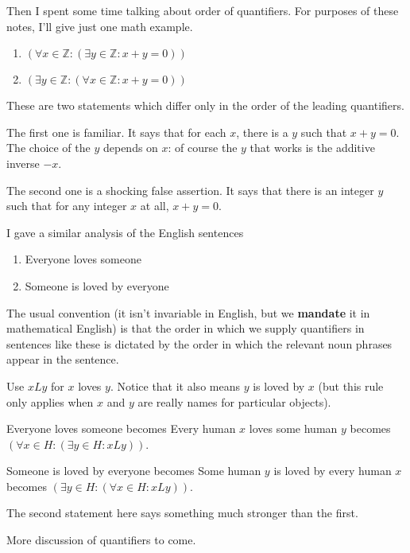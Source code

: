 \documentclass[12pt]{article}
\begin{document}
Then I spent some time talking about order of quantifiers.  For purposes of these notes, I'll give just one math example.

\begin{enumerate}

\item $(\forall x \in {\mathbb Z}:(\exists y \in {\mathbb Z}:x+y=0))$

\item $(\exists y \in {\mathbb Z}:(\forall x \in {\mathbb Z}:x+y=0))$

\end{enumerate}

These are two statements which differ only in the order of the leading quantifiers.

The first one is familiar.  It says that for each $x$, there is a $y$ such that $x+y=0$.  The choice of the $y$ depends on $x$:  of course the $y$ that works is the additive inverse $-x$.

The second one is a shocking false assertion.  It says that there is an integer $y$ such that for any integer $x$ at all, $x+y=0$.

I gave a similar analysis of the English sentences

\begin{enumerate}

\item Everyone loves someone

\item Someone is loved by everyone

\end{enumerate}

The usual convention (it isn't invariable in English, but we {\bf mandate} it in mathematical English) is that the order in which we supply quantifiers in sentences like these is dictated by the order in which the relevant noun phrases appear in the sentence.

Use $x L y$ for $x$ loves $y$.  Notice that it also means $y$ is loved by $x$ (but this rule only applies when $x$ and $y$ are really names for particular objects).

Everyone loves someone becomes Every human $x$ loves some human $y$ becomes $(\forall x \in H:(\exists y \in H:x L y))$.

Someone is loved by everyone becomes Some human $y$ is loved by every human $x$ becomes $(\exists y \in H:(\forall x \in H:x L y))$.

The second statement here says something much stronger than the first.

More discussion of quantifiers to come.
\end{document}
